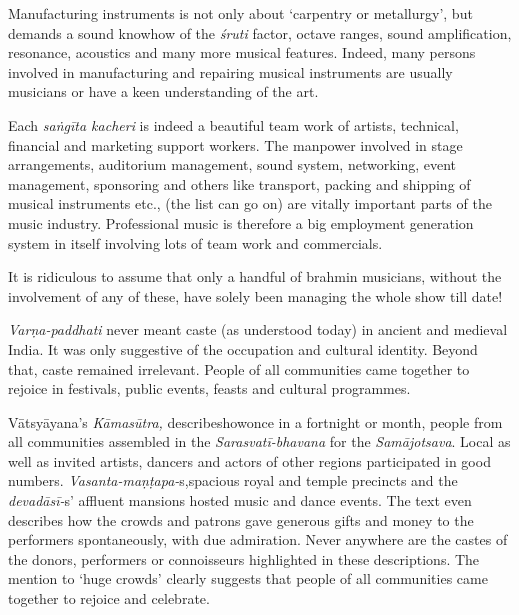 Manufacturing instruments is not only about ‘carpentry or metallurgy’, but demands a sound knowhow of the \textit{śruti} factor, octave ranges, sound amplification, resonance, acoustics and many more musical features. Indeed, many persons involved in manufacturing and repairing musical instruments are usually musicians or have a keen understanding of the art.

Each \textit{saṅgīta kacheri} is indeed a beautiful team work of artists, technical, financial and marketing support workers. The manpower involved in stage arrangements, auditorium management, sound system, networking, event management, sponsoring and others like transport, packing and shipping of musical instruments etc., (the list can go on) are vitally important parts of the music industry. Professional music is therefore a big employment generation system in itself involving lots of team work and commercials.

It is ridiculous to assume that only a handful of brahmin musicians, without the involvement of any of these, have solely been managing the whole show till date!

\textit{Varṇa-paddhati} never meant caste (as understood today) in ancient and medieval India. It was only suggestive of the occupation and cultural identity. Beyond that, caste remained irrelevant. People of all communities came together to rejoice in festivals, public events, feasts and cultural programmes.

Vātsyāyana’s \textit{Kāmasūtra,} describeshowonce in a fortnight or month, people from all communities assembled in the \textit{Sarasvatī-bhavana} for the \textit{Samājotsava}. Local as well as invited artists, dancers and actors of other regions participated in good numbers. \textit{Vasanta-maṇṭapa-}s,\break spacious royal and temple precincts and the \textit{devadāsī-}s’ affluent mansions hosted music and dance events. The text even describes how the crowds and patrons gave generous gifts and money to the performers spontaneously, with due admiration. Never anywhere are the castes of the donors, performers or connoisseurs highlighted in these descriptions. The mention to ‘huge crowds’ clearly suggests that people of all communities came together to rejoice and celebrate.

